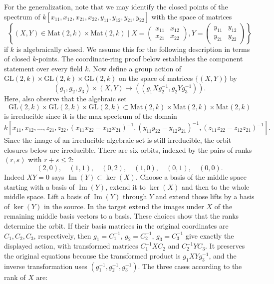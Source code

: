 \begin{example}
\medskip\noindent
For the generalization, note that we may identify the closed
points of the spectrum of
$k[x_{11}, x_{12}, x_{21}, x_{22}, y_{11}, y_{12}, y_{21}, y_{22}]$
with the space of matrices
$$
\left\{ (X, Y) \in \text{Mat}(2, k)\times \text{Mat}(2, k) \mid
X = \left(
\begin{matrix}
x_{11} & x_{12}\\
x_{21} & x_{22}
\end{matrix}
\right),
Y= \left(
\begin{matrix}
y_{11} & y_{12}\\
y_{21} & y_{22}
\end{matrix}
\right)
\right\}
$$
if $k$ is algebraically closed. We assume this for the following
description in terms of closed $k$-points. The coordinate-ring proof
below establishes the component statement over every field $k$.
Now define a group action of
$\text{GL}(2, k)\times \text{GL}(2, k)\times \text{GL}(2, k)$
on the space of matrices $\{(X, Y)\}$ by
$$
(g_1, g_2, g_3) \times (X, Y) \mapsto ((g_1Xg_2^{-1}, g_2Yg_3^{-1})).
$$
Here, also observe that the algebraic set
$$
\text{GL}(2, k)\times \text{GL}(2, k)\times \text{GL}(2, k) \subset
\text{Mat}(2, k)\times \text{Mat}(2, k) \times \text{Mat}(2, k)
$$
is irreducible since it is the max spectrum of the domain
$$
k[x_{11}, x_{12}, \ldots, z_{21}, z_{22}, (x_{11}x_{22}-x_{12}x_{21})^{-1}
, (y_{11}y_{22}-y_{12}y_{21})^{-1}, (z_{11}z_{22}-z_{12}z_{21})^{-1}].
$$
Since the image of an irreducible algebraic set is still
irreducible, the orbit closures below are irreducible. There are
six orbits, indexed by the pairs of ranks $(r,s)$ with $r+s\leq2$:
$$
(2,0),\quad(1,1),\quad(0,2),\quad(1,0),\quad(0,1),\quad(0,0).
$$
Indeed $XY=0$ says $\operatorname{Im}(Y)\subset\ker(X)$.
Choose a basis of the middle space starting with a basis of
$\operatorname{Im}(Y)$, extend it to $\ker(X)$ and then to the
whole middle space. Lift a basis of $\operatorname{Im}(Y)$ through
$Y$ and extend those lifts by a basis of $\ker(Y)$ in the source.
In the target extend the images under $X$ of the remaining middle
basis vectors to a basis. These choices show that the ranks determine
the orbit. If their basis matrices in the original coordinates are
$C_1,C_2,C_3$, respectively, then
$g_1=C_1^{-1}$, $g_2=C_2^{-1}$, $g_3=C_3^{-1}$ give exactly
the displayed action, with transformed matrices
$C_1^{-1}XC_2$ and $C_2^{-1}YC_3$. It preserves the original
equations because the transformed product is $g_1XYg_3^{-1}$,
and the inverse transformation uses $(g_1^{-1},g_2^{-1},g_3^{-1})$.
The three cases according to the rank of $X$ are:

\end{example}
